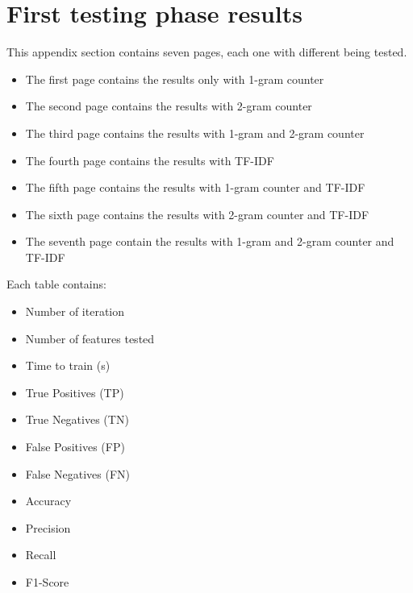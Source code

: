 \documentclass[journal]{IEEEtran}
\begin{document}



\newpage
\appendices
\section{First testing phase results}
\label{AppA}
This appendix section contains seven pages, each one with different being tested.
\begin{itemize}
\item The first page contains the results only with 1-gram counter
\item The second page contains the results with 2-gram counter
\item The third page contains the results with 1-gram and 2-gram counter
\item The fourth page contains the results with TF-IDF
\item The fifth page contains the results with 1-gram counter and TF-IDF
\item The sixth page contains the results with 2-gram counter and TF-IDF
\item The seventh page contain the results with 1-gram and 2-gram counter and TF-IDF
\end{itemize}

Each table contains:
\begin{itemize}
\item Number of iteration
\item Number of features tested
\item Time to train (s)
\item True Positives (TP)
\item True Negatives (TN)
\item False Positives (FP)
\item False Negatives (FN)
\item Accuracy
\item Precision
\item Recall
\item F1-Score
\end{itemize}

\newpage
\clearpage




\end{document}
